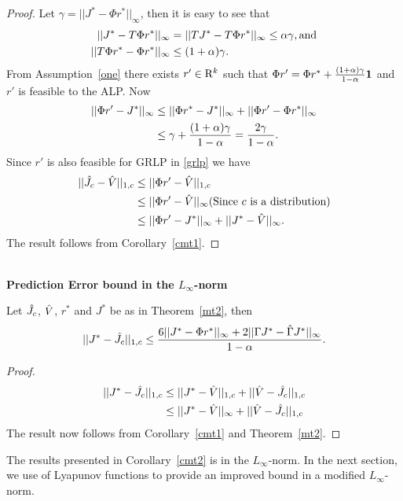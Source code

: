 \documentclass[12pt,draftcls,onecolumn]{IEEEtran}
\begin{document}
\begin{proof}
Let $\gamma=||J^*-\Phi r^*||_\infty$, then  it is easy to see that
\begin{align}
||J^*-T\Phi r^*||_\infty&=||TJ^*-T\Phi r^*||_\infty\leq\alpha\gamma,\mb\text{and}\nn\\\vspace{10pt}
||T\Phi r^*-\Phi r^*||_\infty&\leq(1+\alpha)\gamma.
\end{align}
From Assumption~\ref{one} there exists $r'\in \mathrm{R}^k$ such that $\Phi r'=\Phi r^*+\frac{(1+\alpha)\gamma}{1-\alpha}\mathbf{1}$ and $r'$ is feasible to the ALP. Now
\begin{align}
||\Phi r'-J^*||_\infty&\leq ||\Phi r^* -J^*||_\infty+||\Phi r'-\Phi r^*||_\infty\nonumber\\&\leq \gamma+\frac{(1+\alpha)\gamma}{1-\alpha}=\frac{2\gamma}{1-\alpha}.
\end{align}
Since $r'$ is also feasible for GRLP in \eqref{grlp} we have
\begin{align}
||\hj-\hv||_{1,c}&\leq||\Phi r'-\hv||_{1,c}\nn\\\vspace{10pt}
&\leq||\Phi r'-\hv||_\infty\mb\text{(Since $c$ is a distribution)}\nn\\
&\leq||\Phi r'-J^*||_\infty+||J^*-\hv||_\infty.\nn
\end{align}
The result follows from Corollary~\ref{cmt1}.
\end{proof}\\
\textbf{Prediction Error bound in the $L_\infty$-norm}\\
\begin{corollary}\label{cmt2}
Let $\hat{J}_c$, $\hat{V}$, $r^*$ and $J^*$ be as in Theorem~\ref{mt2}, then
\begin{align}\label{finalbnd}
||J^*-\hj||_{1,c}\leq\frac{6 ||J^*-\Phi r^*||_\infty+2||\Gamma J^*-\hg J^*||_\infty}{1-\alpha}.
\end{align}
\end{corollary}
\begin{proof}
\begin{align}
||J^*-\hj||_{1,c}&\leq||J^*-\hv||_{1,c}+||\hv-\hj||_{1,c}\nn\\\vspace{10pt}
&\leq||J^*-\hv||_\infty+||\hv-\hj||_{1,c}\nn
\end{align}
The result now follows from Corollary~\ref{cmt1} and Theorem~\ref{mt2}.
\end{proof}
The results presented in Corollary~\ref{cmt2} is in the $L_\infty$-norm. In the next section, we use of Lyapunov functions to provide an improved bound in a modified $L_\infty$-norm.
\end{document}
